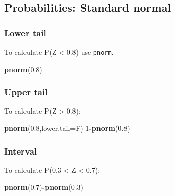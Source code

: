 \documentclass[]{article}
\newenvironment{Shaded}{\begin{snugshade}}{\end{snugshade}}
\newcommand{\DataTypeTok}[1]{\textcolor[rgb]{0.13,0.29,0.53}{#1}}
\newcommand{\DecValTok}[1]{\textcolor[rgb]{0.00,0.00,0.81}{#1}}
\newcommand{\FloatTok}[1]{\textcolor[rgb]{0.00,0.00,0.81}{#1}}
\newcommand{\KeywordTok}[1]{\textcolor[rgb]{0.13,0.29,0.53}{\textbf{#1}}}
\newcommand{\NormalTok}[1]{#1}
\newcommand{\OperatorTok}[1]{\textcolor[rgb]{0.81,0.36,0.00}{\textbf{#1}}}
\begin{document}
\hypertarget{probabilities-standard-normal}{%
\subsection{Probabilities: Standard normal}\label{probabilities-standard-normal}}

\hypertarget{lower-tail}{%
\subsubsection{Lower tail}\label{lower-tail}}

To calculate P(Z \textless{} 0.8) use \texttt{pnorm}.

\begin{Shaded}
\begin{Highlighting}[]
\KeywordTok{pnorm}\NormalTok{(}\FloatTok{0.8}\NormalTok{)}
\end{Highlighting}
\end{Shaded}

\hypertarget{upper-tail}{%
\subsubsection{Upper tail}\label{upper-tail}}

To calculate P(Z \textgreater{} 0.8):

\begin{Shaded}
\begin{Highlighting}[]
\KeywordTok{pnorm}\NormalTok{(}\FloatTok{0.8}\NormalTok{,}\DataTypeTok{lower.tail=}\NormalTok{F)}
\DecValTok{1}\OperatorTok{-}\KeywordTok{pnorm}\NormalTok{(}\FloatTok{0.8}\NormalTok{)}
\end{Highlighting}
\end{Shaded}

\hypertarget{interval}{%
\subsubsection{Interval}\label{interval}}

To calculate P(0.3 \textless{} Z \textless{} 0.7):

\begin{Shaded}
\begin{Highlighting}[]
\KeywordTok{pnorm}\NormalTok{(}\FloatTok{0.7}\NormalTok{)}\OperatorTok{-}\KeywordTok{pnorm}\NormalTok{(}\FloatTok{0.3}\NormalTok{)}
\end{Highlighting}
\end{Shaded}
\end{document}

